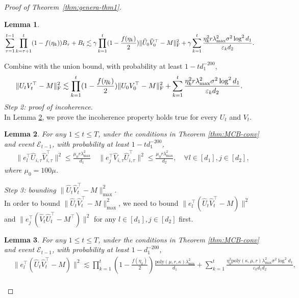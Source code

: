 \documentclass[12pt]{article}
\newcommand\fro[1]{\| #1 \|_{\rm{F}}}
\newtheorem{Lemma}{Lemma}
\theoremstyle{plain}
\begin{document}
\begin{proof}[Proof of Theorem~\ref{thm:genera-thm1}]
\begin{Lemma}
\begin{align*}
            &\sum_{\tau=1}^{t-1}\prod_{k=\tau+1}^{t} (1-f(\eta_k))B_{\tau}+B_t\lesssim \gamma\prod_{k=1}^{t}(1-\frac{f(\eta_k)}{2}) \fro{\widehat{U}_{0}\widehat{V}_{0}^{\top} - M}^2 + \gamma\sum_{k=1}^{t}\frac{\eta_k^2r\lambda_{\max}^2\sigma^2\log^2d_1}{\varepsilon_kd_2}.
        \end{align*}
    \end{Lemma}
    \noindent Combine with the union bound, with probability at least $1-td_1^{-200}$,
    \begin{align*}
        \fro{U_tV_t^{\top} - M}^2&\lesssim \prod_{k=1}^{t} (1-\frac{f(\eta_k)}{2}) \fro{U_0V_0^{\top}-M}^2 + \sum_{k=1}^{t}\frac{\eta_k^2r\lambda_{\max}^2\sigma^2\log^2d_1}{\varepsilon_kd_2}.
    \end{align*}
    \emph{Step 2: proof of incoherence.} \\
    In Lemma \ref{incoherence}, we prove the incoherence property holds true for every $U_t$ and $V_t$.
    \begin{Lemma}
        \label{incoherence} 
        For any $1\leq t\leq T$, under the conditions in Theorem \ref{thm:MCB-conv} and event $\mathcal{E}_{t-1}$, with probability at least $1-td_1^{-200}$,
        \begin{align*}
            \|e_l^{\top} \widehat{U}_{i,\tau}\widehat{V}_{i,\tau}^{\top}\|^2 \leq \frac{\mu_0r\lambda_{\max}^2}{d_1}\quad  \|e_j^{\top} \widehat{V}_{i,\tau}\widehat{U}_{i,\tau}^{\top}\|^2 \leq \frac{\mu_0r\lambda_{\max}^2}{d_2},\quad \forall l \in [d_1], j \in [d_2],
        \end{align*}
        where $\mu_0=100\mu$.
    \end{Lemma}
    \noindent \emph{Step 3: bounding $\|\widehat{U}_t\widehat{V}_t^{\top}-M\|_{\max}^2$.} \\
    In order to bound $\|\widehat{U}_t\widehat{V}_t^{\top}-M\|_{\max}^2$, we need to bound $\|e_l^{\top}(\widehat{U}_t\widehat{V}_t^{\top}-M)\|^2$ and $\|e_j^{\top}(\widehat{V}_t\widehat{U}_t^{\top}-M^{\top})\|^2$ for any $l \in [d_1], j\in [d_2]$ first.
    \begin{Lemma}
        \label{lemma2max}
        For any $1\leq t\leq T$, under the conditions in Theorem \ref{thm:MCB-conv} and event $\mathcal{E}_{t-1}$, with probability at least $1-d_1^{-200}$, 
        \begin{align*}
            &\|e_l^{\top}(\widehat{U}_t\widehat{V}_t^{\top}-M)\|^2\lesssim \prod_{k=1}^{t}(1-\frac{f(\eta_k)}{2}) \frac{\text{poly}(\mu,r,\kappa)\lambda_{\min}^2}{d_1} +   \sum_{k=1}^{t} \frac{\eta_k^2\text{poly}(\kappa,\mu,r)\lambda_{\max}^2\sigma^2\log^2d_1}{\varepsilon_k d_1d_2}, \\

\end{align*}
\end{Lemma}
\end{proof}
\end{document}
